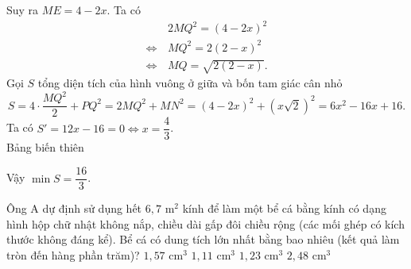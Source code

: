 \begin{vd}
{        Suy ra $ME=4-2x$.
        Ta có \begin{align*}
            &\, 2MQ^2={( 4-2x )}^2 \\ 
            \Leftrightarrow&\, MQ^2=2(2-x)^2 \\ 
            \Leftrightarrow&\, MQ=\sqrt{2(2-x)}.
        \end{align*}
        Gọi $S$ tổng diện tích của hình vuông ở giữa và bốn tam giác cân nhỏ
        $$S=4\cdot\dfrac{MQ^2}{2}+PQ^2=2MQ^2+MN^2=(4-2x)^2+\left(x\sqrt{2}\right)^2=6x^2-16x+16.$$
        Ta có $S'=12x-16=0\Leftrightarrow x=\dfrac{4}{3}$.\\
        Bảng biến thiên
        \begin{center}
        \end{center}
        Vậy $\min S=\dfrac{16}{3}$.} 
\end{vd}
\begin{vd}%
    Ông A dự định sử dụng hết $6{,}7$ m$^2$ kính để làm một bể cá bằng kính có dạng hình hộp chữ nhật không nắp, chiều dài gấp đôi chiều rộng (các mối ghép có kích thước không đáng kể). Bể cá có dung tích lớn nhất bằng bao nhiêu (kết quả làm tròn đến hàng phần trăm)?
    \choice
    {\True $1{,}57$ cm$^3$}
    {$1{,}11$ cm$^3$}
    {$1{,}23$ cm$^3$}
    {$2{,}48$ cm$^3$}
\end{vd}
